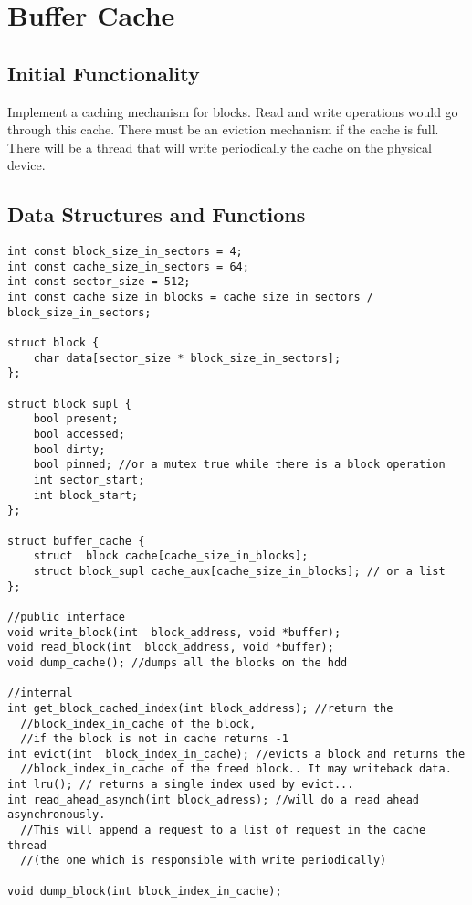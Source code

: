 \section{Buffer Cache}
\subsection{Initial Functionality}
Implement a caching mechanism for blocks. Read and write operations would go through this cache. There must be an eviction mechanism if the cache is full.
There will be a thread that will write periodically the cache on the physical device.
  

\subsection{Data Structures and Functions}
\begin{lstlisting}
int const block_size_in_sectors = 4;
int const cache_size_in_sectors = 64;
int const sector_size = 512;
int const cache_size_in_blocks = cache_size_in_sectors /  block_size_in_sectors;

struct block {
	char data[sector_size * block_size_in_sectors]; 
};

struct block_supl {
	bool present;
	bool accessed;
	bool dirty;
	bool pinned; //or a mutex true while there is a block operation
	int sector_start;
	int block_start;
};

struct buffer_cache {
	struct	block cache[cache_size_in_blocks]; 
	struct block_supl cache_aux[cache_size_in_blocks]; // or a list
};

//public interface
void write_block(int  block_address, void *buffer);
void read_block(int  block_address, void *buffer);
void dump_cache(); //dumps all the blocks on the hdd

//internal
int get_block_cached_index(int block_address); //return the  
  //block_index_in_cache of the block, 
  //if the block is not in cache returns -1
int evict(int  block_index_in_cache); //evicts a block and returns the  
  //block_index_in_cache of the freed block.. It may writeback data.
int lru(); // returns a single index used by evict...
int read_ahead_asynch(int block_adress); //will do a read ahead asynchronously. 
  //This will append a request to a list of request in the cache thread 
  //(the one which is responsible with write periodically)

void dump_block(int block_index_in_cache);
\end{lstlisting}


